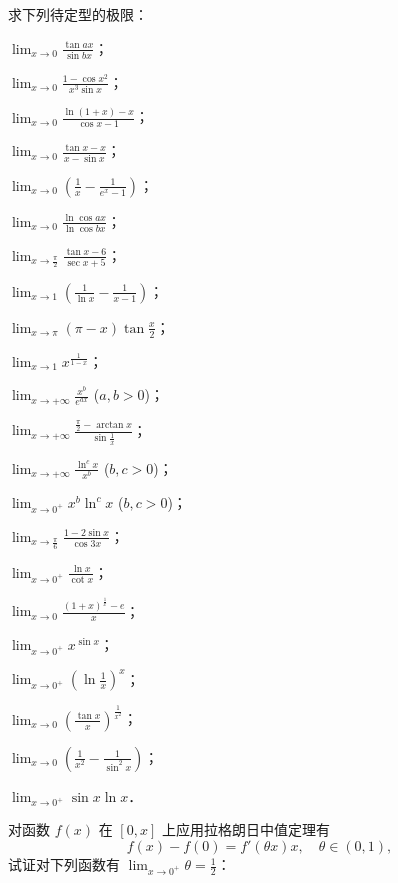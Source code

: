\begin{xiti}
\item 求下列待定型的极限：
\begin{ziti}
\item $\lim_{x\to0} \frac{\tan ax}{\sin bx}$；
\item $\lim_{x\to0} \frac{1 - \cos x^2}{x^3 \sin x}$；
\item $\lim_{x\to0} \frac{\ln(1+x)-x}{\cos x-1}$；
\item $\lim_{x\to0} \frac{\tan x - x}{x - \sin x}$；
\item $\lim_{x\to0} \left( \frac{1}{x} - \frac{1}{e^x - 1} \right)$；
\item $\lim_{x\to0} \frac{\ln \cos ax}{\ln \cos bx}$；
\item $\lim_{x\to\frac{\pi}{2}} \frac{\tan x - 6}{\sec x + 5}$；
\item $\lim_{x\to1} \left( \frac{1}{\ln x} - \frac{1}{x-1} \right)$；
\item $\lim_{x\to\pi} (\pi - x) \tan \frac{x}{2}$；
\item $\lim_{x\to1} x^{\frac{1}{1-x}}$；
\item $\lim_{x\to+\infty} \frac{x^b}{e^{ax}}$ ($a, b > 0$)；
\item $\lim_{x\to+\infty} \frac{\frac{\pi}{2} - \arctan x}{\sin \frac{1}{x}}$；
\item $\lim_{x\to+\infty} \frac{\ln^c x}{x^b}$ ($b, c > 0$)；
\item $\lim_{x\to0^+} x^b \ln^c x$ ($b, c > 0$)；
\item $\lim_{x\to\frac{\pi}{6}} \frac{1 - 2\sin x}{\cos 3x}$；
\item $\lim_{x\to0^+} \frac{\ln x}{\cot x}$；
\item $\lim_{x\to0} \frac{(1+x)^{\frac{1}{x}} - e}{x}$；
\item $\lim_{x\to0^+} x^{\sin x}$；
\item $\lim_{x\to0^+} \left( \ln \frac{1}{x} \right)^x$；
\item $\lim_{x\to0} \left( \frac{\tan x}{x} \right)^{\frac{1}{x^2}}$；
\item $\lim_{x\to0} \left( \frac{1}{x^2} - \frac{1}{\sin^2 x} \right)$；
\item $\lim_{x\to0^+} \sin x \ln x$．
\end{ziti}
\item 对函数 $f(x)$ 在 $[0, x]$ 上应用拉格朗日中值定理有
\[
f(x) - f(0) = f'(\theta x)x,\quad \theta \in (0, 1),
\]
试证对下列函数有 $\lim_{x\to0^+} \theta = \frac{1}{2}$：
\begin{ziti}

\end{ziti}
\end{xiti}

